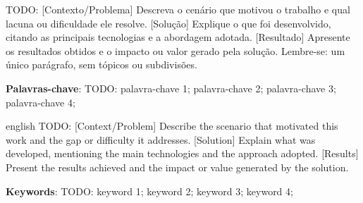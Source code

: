 %
%
%


\begin{resumo}
  TODO: [Contexto/Problema] Descreva o cenário que motivou o trabalho e
  qual lacuna ou dificuldade ele resolve. [Solução] Explique o que foi
  desenvolvido, citando as principais tecnologias e a abordagem adotada.
  [Resultado] Apresente os resultados obtidos e o impacto ou valor gerado
  pela solução. Lembre-se: um único parágrafo, sem tópicos ou subdivisões.

  \vspace{\onelineskip}
  \noindent
  \textbf{Palavras-chave}: TODO: palavra-chave 1; palavra-chave 2;
  palavra-chave 3; palavra-chave 4;
\end{resumo}


\begin{resumo}[Abstract]
  \begin{otherlanguage*}{english}
    TODO: [Context/Problem] Describe the scenario that motivated this work
    and the gap or difficulty it addresses. [Solution] Explain what was
    developed, mentioning the main technologies and the approach adopted.
    [Results] Present the results achieved and the impact or value generated
    by the solution.

    \vspace{\onelineskip}
    \noindent
    \textbf{Keywords}: TODO: keyword 1; keyword 2; keyword 3; keyword 4;
  \end{otherlanguage*}
\end{resumo}
